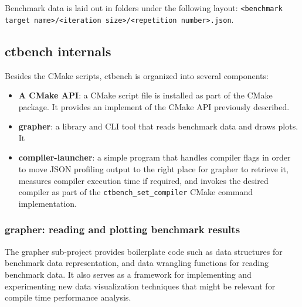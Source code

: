 \documentclass[../main]{subfiles}
\begin{document}
Benchmark data is laid out in folders under the following layout:
\lstinline{<benchmark target name>/<iteration size>/<repetition number>.json}.

\subsection{
  ctbench internals
}

Besides the CMake scripts, ctbench is organized into several components:

\begin{itemize}

\item
\textbf{A CMake API}: a CMake script file is installed as part of the CMake
package. It provides an implement of the CMake API previously described.

\item
\textbf{grapher}: a \cpp library and CLI tool that reads benchmark data
and draws plots. It

\item
\textbf{compiler-launcher}: a simple program that handles compiler flags in
order to move JSON profiling output to the right place for grapher
to retrieve it, measures compiler execution time if required, and invokes the
desired compiler as part of the \lstinline{ctbench_set_compiler} CMake
command implementation.

\end{itemize}

\subsubsection{
  grapher: reading and plotting benchmark results
}

The grapher sub-project provides boilerplate code such as data structures
for benchmark data representation, and data wrangling functions for reading
benchmark data. It also serves as a framework for implementing and experimenting
new data visualization techniques that might be relevant for compile time
performance analysis.
\end{document}
